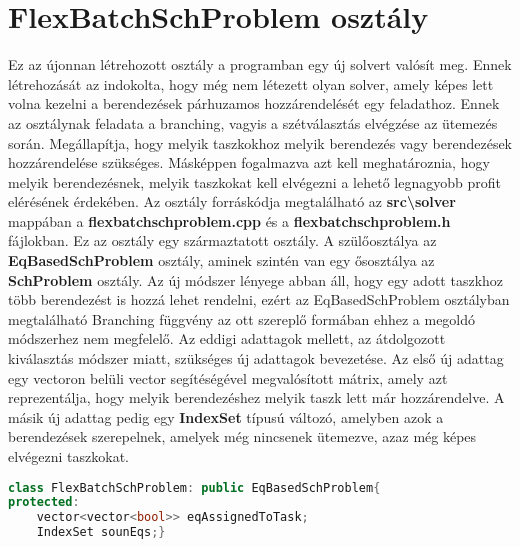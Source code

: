 \section{FlexBatchSchProblem osztály}
Ez az újonnan létrehozott osztály a programban egy új solvert valósít meg.
Ennek létrehozását az indokolta, hogy még nem létezett olyan solver, amely képes lett volna kezelni a berendezések párhuzamos hozzárendelését egy feladathoz.
Ennek az osztálynak feladata a branching, vagyis a szétválasztás elvégzése az ütemezés során.
Megállapítja, hogy melyik taszkokhoz melyik berendezés vagy berendezések hozzárendelése szükséges.
Másképpen fogalmazva azt kell meghatároznia, hogy melyik berendezésnek, melyik taszkokat kell elvégezni a lehető legnagyobb profit elérésének érdekében.
Az osztály forráskódja megtalálható az \textbf{src\textbackslash solver} mappában a \textbf{flexbatchschproblem.cpp} és a \textbf{flexbatchschproblem.h} fájlokban.
Ez az osztály egy származtatott osztály.
A szülőosztálya az \textbf{EqBasedSchProblem} osztály, aminek szintén van egy ősosztálya az \textbf{SchProblem} osztály.
Az új módszer lényege abban áll, hogy egy adott taszkhoz több berendezést is hozzá lehet rendelni, ezért az EqBasedSchProblem osztályban megtalálható Branching függvény az ott szereplő formában ehhez a megoldó módszerhez nem megfelelő.
Az eddigi adattagok mellett, az átdolgozott kiválasztás módszer miatt, szükséges új adattagok bevezetése.
Az első új adattag egy vectoron belüli vector segítéségével megvalósított mátrix, amely azt reprezentálja, hogy melyik berendezéshez melyik taszk lett már hozzárendelve.
A másik új adattag pedig egy \textbf{IndexSet} típusú változó, amelyben azok a berendezések szerepelnek, amelyek még nincsenek ütemezve, azaz még képes elvégezni taszkokat.
\begin{lstlisting}[caption={FlexBatchSchProblem osztály adattagjai},language=c++,numbers=none]
class FlexBatchSchProblem: public EqBasedSchProblem{
protected:
	vector<vector<bool>> eqAssignedToTask;
    IndexSet sounEqs;}
\end{lstlisting}

